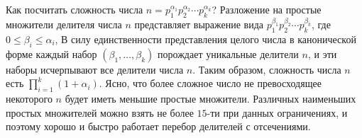 Как посчитать сложность числа
$n = p_1^{\alpha_1} p_2^{\alpha_2} \cdots p_k^{\alpha_k}$?
Разложение на простые множители делителя числа $n$
представляет выражение вида $p_1^{\beta_1}p_2^{\beta_2}\cdots p_k^{\beta_k}$,
где $0 \le \beta_i \le \alpha_i$, В силу единственности представления
целого числа в канонической форме каждый набор $(\beta_1, \ldots, \beta_k)$
порождает уникальные делители $n$,
и эти наборы исчерпывают все делители числа $n$.
Таким образом, сложность числа $n$ есть $\prod_{i=1}^{k}(1+\alpha_i)$.
Ясно, что более сложное число не превосходящее некоторого $n$
будет иметь меньшие простые множители.
Различных наименьших простых множителей можно взять
не более $15$-ти при данных ограничениях, и поэтому
хорошо и быстро работает перебор делителей с отсечениями.
